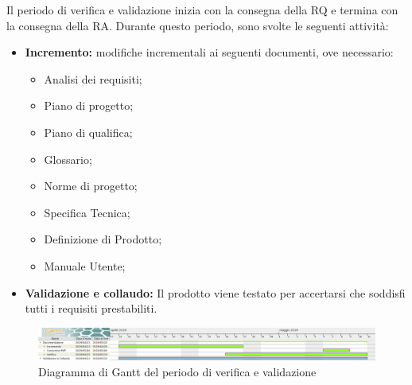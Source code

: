 Il periodo di verifica e validazione inizia con la consegna della RQ e termina con la consegna della RA.\newline
Durante questo periodo, sono svolte le seguenti attività:
\begin{itemize}
	\item \textbf{Incremento: }modifiche incrementali ai seguenti documenti, ove necessario:
	\begin{itemize}
		\item Analisi dei requisiti;
		\item Piano di progetto;
		\item Piano di qualifica;
		\item Glossario;
		\item Norme di progetto;
		\item Specifica Tecnica;
		\item Definizione di Prodotto;
		\item Manuale Utente;
	\end{itemize}
	\item \textbf{Validazione e collaudo: }Il prodotto viene testato per accertarsi che soddisfi tutti i requisiti prestabiliti.
\end{itemize}


\begin{figure}[H]
	\includegraphics[width=1\linewidth]{Pianificazione/Verifica_Validazione.png}
	\caption{Diagramma di Gantt del periodo di verifica e validazione}
\end{figure}
